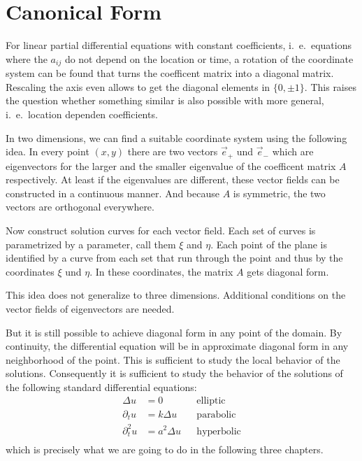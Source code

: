 %
%
%
\section{Canonical Form}
For linear partial differential equations with constant coefficients,
i.~e.~equations where the $a_{ij}$ do not depend on the location or time,
a rotation of the coordinate system can be found that turns the coefficent
matrix into a diagonal matrix.
Rescaling the axis even allows to get the diagonal elements in $\{0,\pm1\}$.
This raises the question whether something similar is also possible with
more general, i.~e.~location dependen coefficients.

In two dimensions, we can find a suitable coordinate system using the
following idea.
In every point $(x,y)$ there are two vectors $\vec e_+$ und $\vec e_-$
which are eigenvectors for the larger and the smaller eigenvalue of the
coefficent matrix $A$ respectively.
At least if the eigenvalues are different, these vector fields can be
constructed in a continuous manner.
And because $A$ is symmetric, the two vectors are orthogonal everywhere.

Now construct solution curves for each vector field.
Each set of curves is parametrized by a parameter, call them $\xi$ and $\eta$.
Each point of the plane is identified by a curve from each set that
run through the point and thus by the coordinates $\xi$ und $\eta$.
In these coordinates, the matrix $A$ gets diagonal form.

This idea does not generalize to three dimensions.
Additional conditions on the vector fields of eigenvectors are needed.

But it is still possible to achieve diagonal form in any point of the
domain.
By continuity, the differential equation will be in approximate diagonal
form in any neighborhood of the point.
This is sufficient to study the local behavior of the solutions.
Consequently it is sufficient to study the behavior of the solutions
of the following standard differential equations:
\begin{align*}
\Delta u&=0&&\text{elliptic}\\
\partial_tu&=k\Delta u&&\text{parabolic}\\
\partial_t^2u&=a^2\Delta u&&\text{hyperbolic}\\
\end{align*}
which is precisely what we are going to do in the following three chapters.


